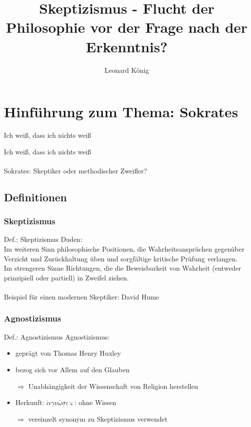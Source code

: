 \documentclass[12pt]{beamer}
\author[L. König]{Leonard König}
\title[Skeptizismus]{Skeptizismus - Flucht der Philosophie vor der Frage nach der Erkenntnis?}
\institute{Herder-Gymnasium}
\begin{document}
\begin{frame}
\titlepage
\end{frame}

\begin{frame}
\tableofcontents
\end{frame}


\section{Hinführung zum Thema: Sokrates}
\begin{frame}{\glqq Ich weiß, dass ich nichts weiß\grqq}
\begin{center}
\glqq Ich weiß, dass ich nichts weiß\grqq\\
\ \\
Sokrates: Skeptiker oder methodischer Zweifler?
\end{center}
\end{frame}

\subsection{Definitionen}
\subsubsection{Skeptizismus}
\begin{frame}{Def.: Skeptizismus}
Duden:\\
\glqq Im weiteren Sinn philosophische Positionen, die Wahrheitsansprüchen gegenüber Verzicht und Zurückhaltung üben und sorgfältige kritische Prüfung verlangen.\\
Im strengeren Sinne Richtungen, die die Beweisbarkeit von Wahrheit (entweder prinzipiell oder partiell) in Zweifel ziehen.\grqq\\
\ \\
Beispiel für einen modernen Skeptiker: David Hume
\end{frame}		

\subsubsection{Agnostizismus}
\begin{frame}{Def.: Agnostizismus}
Agnostizismus:
\begin{itemize}
\item geprägt von Thomas Henry Huxley
\item bezog sich vor Allem auf den Glauben
\item[$\Rightarrow$] Unabhängigkeit der Wissenschaft von Religion herstellen
\item Herkunft: $\grave{\alpha}\gamma\nu\bar{\omega}\sigma\iota\varsigma$: \glqq ohne Wissen\grqq\
\item[$\Rightarrow$] vereinzelt synonym zu Skeptizismus verwendet
\end{itemize}
\end{frame}
\end{document}
